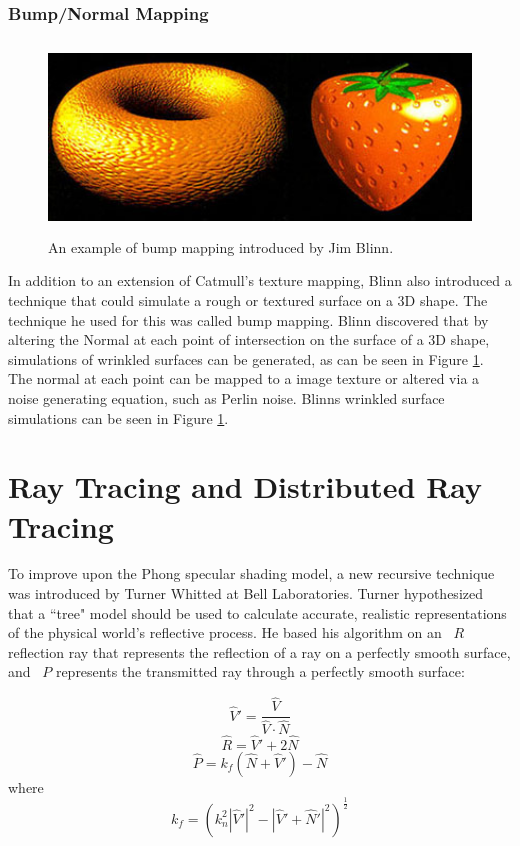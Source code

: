\subsubsection{Bump/Normal Mapping}
\label{subsubsec:BNMap}
\begin{figure}[h]
\centering
\includegraphics[height=2.0in]{figures/blinn_bump.jpg}
\caption{An example of bump mapping introduced by Jim Blinn. \cite{blinn1978simulation}}
\label{fig:bumpmap}
\end{figure}
In addition to an extension of Catmull's texture mapping, Blinn also introduced a technique that could simulate a rough or textured surface on a 3D shape\cite{blinn1976texture}.  The technique he used for this was called bump mapping.  Blinn discovered that by altering the Normal at each point of intersection on the surface of a 3D shape, simulations of wrinkled surfaces can be generated, as can be seen in Figure \ref{fig:bumpmap}.  The normal at each point can be mapped to a image texture or altered via a noise generating equation, such as Perlin noise.  Blinns wrinkled surface simulations can be seen in Figure \ref{fig:bumpmap}.
\section{Ray Tracing and Distributed Ray Tracing}
To improve upon the Phong specular shading model, a new recursive technique was introduced by Turner Whitted at Bell Laboratories.  Turner hypothesized that a ``tree" model should be used to calculate accurate, realistic representations of the physical world's reflective process.  He based his algorithm on an ~$R$ reflection ray that represents the reflection of a ray on a perfectly smooth surface, and ~$P$ represents the transmitted ray through a perfectly smooth surface:

\begin{equation}
\label{eq:raytracing1}
\hat{V}' = \frac{\hat{V}}{\hat{V} \cdot \hat{N}}
\end{equation}
\begin{equation}
\label{eq:raytracing2}
\hat{R} = \hat{V}' + 2\hat{N}
\end{equation}
\begin{equation}
\label{eq:raytracing3}
\hat{P} = k_{f}(\hat{N} + \hat{V}') - \hat{N}
\end{equation}
where
\begin{equation}
\label{eq:raytracing4}
k_{f} = (k_{n}^{2}|\hat{V}'|^{2} - |\hat{V}' + \hat{N}'|^2)^{\frac{1}{2}}
\end{equation}

